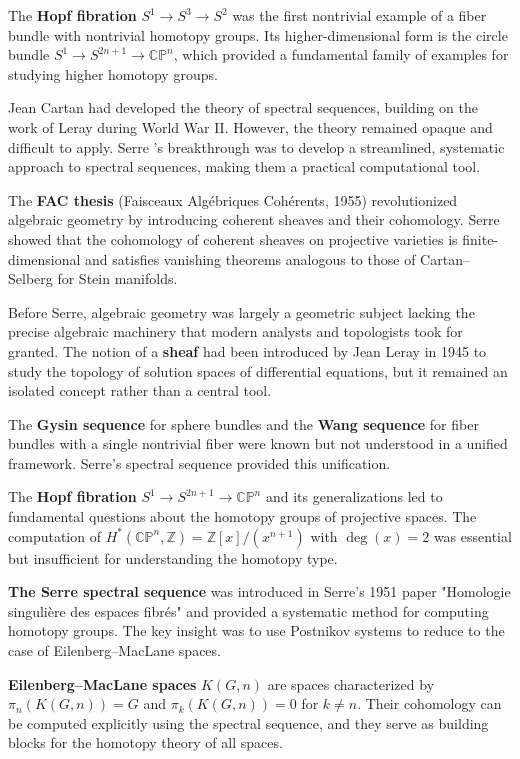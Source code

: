 The \textbf{Hopf fibration} $S^1 \to S^3 \to S^2$ was the first nontrivial example of a fiber bundle with nontrivial homotopy groups. Its higher-dimensional form is the circle bundle $S^1\to S^{2n+1}\to\mathbb{CP}^n$, which provided a fundamental family of examples for studying higher homotopy groups.

Jean Cartan had developed the theory of spectral sequences, building on the work of Leray during World War II. However, the theory remained opaque and difficult to apply. Serre \cite{serre1954}'s breakthrough was to develop a streamlined, systematic approach to spectral sequences, making them a practical computational tool.

The \textbf{FAC thesis} (Faisceaux Algébriques Cohérents, 1955) revolutionized algebraic geometry by introducing coherent sheaves and their cohomology. Serre showed that the cohomology of coherent sheaves on projective varieties is finite-dimensional and satisfies vanishing theorems analogous to those of Cartan--Selberg for Stein manifolds.

Before Serre, algebraic geometry was largely a geometric subject lacking the precise algebraic machinery that modern analysts and topologists took for granted. The notion of a \textbf{sheaf} had been introduced by Jean Leray in 1945 to study the topology of solution spaces of differential equations, but it remained an isolated concept rather than a central tool.

The \textbf{Gysin sequence} for sphere bundles and the \textbf{Wang sequence} for fiber bundles with a single nontrivial fiber were known but not understood in a unified framework. Serre's spectral sequence provided this unification.

The \textbf{Hopf fibration} $S^1 \to S^{2n+1} \to \mathbb{CP}^n$ and its generalizations led to fundamental questions about the homotopy groups of projective spaces. The computation of $H^*(\mathbb{CP}^n, \mathbb{Z}) = \mathbb{Z}[x]/(x^{n+1})$ with $\deg(x) = 2$ was essential but insufficient for understanding the homotopy type.

\textbf{The Serre spectral sequence} was introduced in Serre's 1951 paper "Homologie singulière des espaces fibrés" and provided a systematic method for computing homotopy groups. The key insight was to use Postnikov systems to reduce to the case of Eilenberg--MacLane spaces.

\textbf{Eilenberg--MacLane spaces} $K(G, n)$ are spaces characterized by $\pi_n(K(G,n)) = G$ and $\pi_k(K(G,n)) = 0$ for $k \neq n$. Their cohomology can be computed explicitly using the spectral sequence, and they serve as building blocks for the homotopy theory of all spaces.

